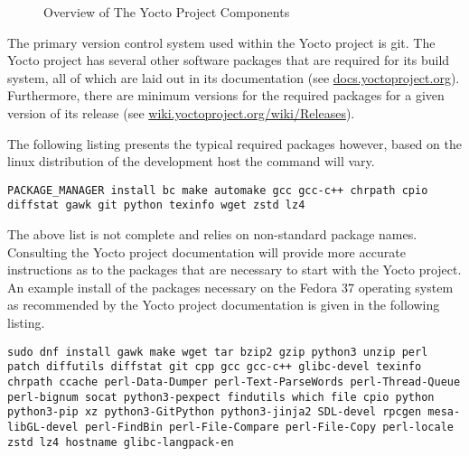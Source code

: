\begin{figure}[h]
	\caption{Overview of The Yocto Project Components}
	\label{fig:yocto-overview}
\end{figure}

The primary version control system used within the Yocto project is git. The Yocto project has several other software packages that are required for its build system, all of which are laid out in its documentation (see \href{https://docs.yoctoproject.org/}{docs.yoctoproject.org}). Furthermore, there are minimum versions for the required packages for a given version of its release (see \href{https://wiki.yoctoproject.org/wiki/Releases}{wiki.yoctoproject.org/wiki/Releases}).

The following listing presents the typical required packages however, based on the linux distribution of the development host the command will vary.

\begin{verbatim}
PACKAGE_MANAGER install bc make automake gcc gcc-c++ chrpath cpio diffstat gawk git python texinfo wget zstd lz4
\end{verbatim}

The above list is not complete and relies on non-standard package names. Consulting the Yocto project documentation will provide more accurate instructions as to the packages that are necessary to start with the Yocto project. An example install of the packages necessary on the Fedora 37 operating system as recommended by the Yocto project documentation is given in the following listing.

\begin{verbatim}
sudo dnf install gawk make wget tar bzip2 gzip python3 unzip perl patch diffutils diffstat git cpp gcc gcc-c++ glibc-devel texinfo chrpath ccache perl-Data-Dumper perl-Text-ParseWords perl-Thread-Queue perl-bignum socat python3-pexpect findutils which file cpio python python3-pip xz python3-GitPython python3-jinja2 SDL-devel rpcgen mesa-libGL-devel perl-FindBin perl-File-Compare perl-File-Copy perl-locale zstd lz4 hostname glibc-langpack-en
\end{verbatim}

